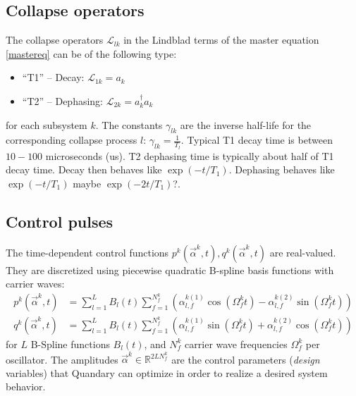 \documentclass[letterpaper]{article}
\newcommand{\YC}[1]{{\textcolor{Bronze}{#1}}}
\newcommand{\Ell}{\mathcal{L}}
\newcommand{\R}{\mathds{R}}
\begin{document}
\subsection{Collapse operators}
The collapse operators $\Ell_{lk}$ in the Lindblad terms of the master equation
\eqref{mastereq} can be of the following type:
\begin{itemize}
  \item ``T1'' -- Decay: $\Ell_{1k} = a_k$
  \item ``T2'' -- Dephasing: $\Ell_{2k} = a_k^{\dagger}a_k$
\end{itemize}
for each subsystem $k$. The constants $\gamma_{lk}$ are the inverse half-life
for the corresponding collapse process $l$: $\gamma_{lk} = {\frac{1}{T_l}}$.
Typical T1 decay time is between $10-100$ microseconds (us). T2 dephasing time
is typically about half of T1 decay time. Decay then behaves like
$\exp(-t/{T_1})$. Dephasing behaves like $\exp(- t / T_1)$ \YC{maybe $\exp(-2t /
T_1)$?}.

\subsection{Control pulses} \label{subsec:controlpulses}
The time-dependent control functions $p^k(\vec{\alpha}^k,t),
q^k(\vec{\alpha}^k,t)$ are real-valued. They are discretized using piecewise quadratic B-spline basis functions with
carrier waves: 
\begin{align}
  p^k(\vec{\alpha}^k,t) &= \sum_{l=1}^L B_l(t) \sum_{f=1}^{N_f^k} \left(\alpha^{k
  (1)}_{l,f} \cos(\Omega_f^k t) - \alpha^{k (2)}_{l,f} \sin(\Omega_f^k t)
  \right) \\
  q^k(\vec{\alpha}^k,t) &= \sum_{l=1}^L B_l(t) \sum_{f=1}^{N_f^k} \left( \alpha^{k
  (1)}_{l,f} \sin(\Omega_f^k t) + \alpha^{k (2)}_{l,f} \cos(\Omega_f^k t)
  \right)
\end{align}
for $L$ B-Spline functions $B_l(t)$, and $N_f^k$ carrier wave frequencies
$\Omega_f^k$ per oscillator. The amplitudes $\vec{\alpha}^k \in \R^{2LN_f^k}$ are the control
parameters (\textit{design} variables) that Quandary can optimize in order to realize a
desired system behavior. 
\end{document}
